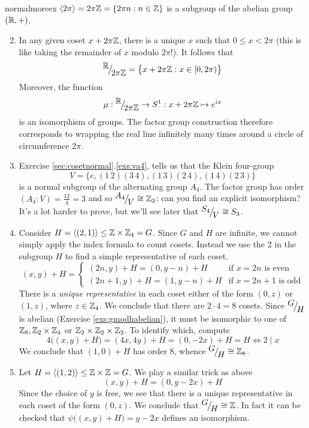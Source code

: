 \begin{examples}{}{normalmoreex}
\exstart $\left\langle 2\pi\right\rangle=2\pi\mathbb{Z}=\{2\pi n:n\in\mathbb{Z}\}$ is a subgroup of the abelian group $(\mathbb{R},+)$.\vspace{-5pt}
\begin{enumerate}\setcounter{enumi}{1}
  \item[] In any given coset $x+2\pi\mathbb{Z}$, there is a unique $x$ such that $0\le x<2\pi$ (this is like taking the remainder of $x$ modulo $2\pi$!). It follows that
  \[{}^{\textstyle {\mathbb{R}}}\!\big/_{\textstyle \!{2\pi\mathbb{Z}}}=\bigl\{x+2\pi\mathbb{Z}:x\in[0,2\pi)\bigr\}\]
  Moreover, the function
  \[\mu:{}^{\textstyle {\mathbb{R}}}\!\big/_{\textstyle \!{2\pi\mathbb{Z}}}\to S^1:x+2\pi\mathbb{Z}\mapsto e^{ix}\]
  is an isomorphism of groups. The factor group construction therefore corresponds to wrapping the real line infinitely many times around a circle of circumference $2\pi$.
  
  \item\label{ex:a4normal} Exercise \ref*{sec:cosetnormal}.\ref{exs:va4}, tells us that the Klein four-group
  \[V=\{e,(1\,2)(3\,4),(1\,3)(2\,4),(1\,4)(2\,3)\}\]
  is a normal subgroup of the alternating group $A_4$. The factor group has order $(A_4:V)=\frac{12}4=3$ and so ${}^{\textstyle {A_4}}\!\big/_{\textstyle \!{V}}\cong\mathbb{Z}_3$: can you find an explicit isomorphism?\smallbreak
  It's a lot harder to prove, but we'll see later that ${}^{\textstyle {S_4}}\!\big/_{\textstyle \!{V}}\cong S_3$.
  
  
  \item Consider $H=\left\langle (2,1)\right\rangle\le\mathbb{Z}\times\mathbb{Z}_4=G$. Since $G$ and $H$ are infinite, we cannot simply apply the index formula to count cosets. Instead we use the 2 in the subgroup $H$ to find a simple representative of each coset.
  \[(x,y)+H=\begin{cases}
  (2n,y)+H=(0,y-n)+H&\text{if $x=2n$ is even}\\
  (2n+1,y)+H=(1,y-n)+H&\text{if $x=2n+1$ is odd}
  \end{cases}\]
  There is a \emph{unique representative} in each coset either of the form $(0,z)$ or $(1,z)$, where $z\in\mathbb{Z}_4$. We conclude that there are $2\cdot 4=8$ cosets. Since ${}^{\textstyle {G}}\!\big/_{\textstyle \!{H}}$ is abelian (Exercise \ref{exs:gmodhabelian}), it must be isomorphic to one of $\mathbb{Z}_8,\mathbb{Z}_2\times\mathbb{Z}_4$ or $\mathbb{Z}_2\times\mathbb{Z}_2\times\mathbb{Z}_2$. To identify which, compute
  \[4\bigl((x,y)+H\bigr)=(4x,4y)+H=(0,-2x)+H=H \iff 2\mid x\]
  We conclude that $(1,0)+H$ has order 8, whence ${}^{\textstyle {G}}\!\big/_{\textstyle \!{H}}\cong\mathbb{Z}_8$.
  
  \item\label{ex:hardgmodh} Let $H=\left\langle (1,2)\right\rangle\le\mathbb{Z}\times\mathbb{Z}=G$. We play a similar trick as above
  \[(x,y)+H=(0,y-2x)+H\]
  Since the choice of $y$ is free, we see that there is a unique representative in each coset of the form $(0,z)$. We conclude that ${}^{\textstyle {G}}\!\big/_{\textstyle \!{H}}\cong\mathbb{Z}$. In fact it can be checked that $\psi\bigl((x,y)+H\bigr)=y-2x$ defines an isomorphism. 


\end{enumerate}
\end{examples}
